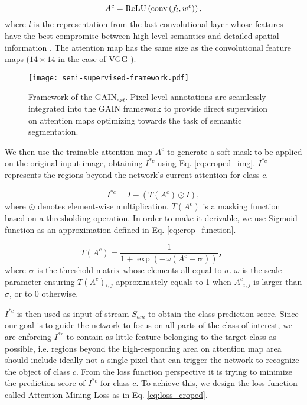 \documentclass[10pt,twocolumn,letterpaper]{article}
\begin{document}
\begin{equation}
\label{eq:attention_map}
{A^c} = {\mathop{\rm ReLU}\nolimits} \left( {{\mathop{\rm conv}\nolimits} \left( {{f_l},{w^c}} \right)} \right),
\end{equation}
where $l$ is the representation from the last convolutional layer whose features have the best compromise between high-level semantics and detailed spatial information \cite{simonyan2013deep}. The attention map has the same size as the convolutional feature maps ($14 \times 14$ in the case of VGG \cite{simonyan2014very}).


\begin{figure*}%
\centering
\texttt{[image: semi-supervised-framework.pdf]} %
\caption{Framework of the GAIN$_{ext}$. Pixel-level annotations are seamlessly integrated into the GAIN framework to provide direct supervision on attention maps optimizing towards the task of semantic segmentation.}
\label{fig:human_supervised} 
\end{figure*} 

We then use the trainable attention map $A^c$ to generate a soft mask to be applied on the original input image, obtaining $I^ {*c}$ using Eq. \ref{eq:croped_img}. $I^ {*c}$ represents the regions beyond the network's current attention for class $c$. 



\begin{equation}
\label{eq:croped_img}
{I^ {*c} } = I - \left( T\left( {{A^c}} \right) \odot I \right),
\end{equation}
where $\odot$ denotes element-wise multiplication. $T\left( {{A^c}} \right)$ is a masking function based on a thresholding operation. In order to make it derivable, we use Sigmoid function as an approximation defined in Eq. \ref{eq:crop_function}.

\begin{equation}
\label{eq:crop_function}
T\left( {{A^c}} \right) = \frac{1}{{1 + \exp \left( { - \omega \left( {{A^c} -  \boldsymbol{\sigma} } \right)} \right)}}，
\end{equation}
where $\boldsymbol{\sigma}$ is the threshold matrix whose elements all equal to $\sigma$. $\omega$ is the scale parameter ensuring $T\left( {{A^c}} \right){}_{i,j}$ approximately equals to 1 when ${A^c}_{i,j}$ is larger than $\sigma$, or to 0 otherwise. 



$I^ {*c}$ is then used as input of stream ${S_{am}}$ to obtain the class prediction score. Since our goal is to guide the network to focus on all parts of the class of interest, we are enforcing $I^ {*c}$ to contain as little feature belonging to the target class as possible, i.e. regions beyond the high-responding area on attention map area should include ideally not a single pixel that can trigger the network to recognize the object of class $c$. From the loss function perspective it is trying to minimize the prediction score of $I^ {*c}$ for class $c$. To achieve this, we design the loss function called Attention Mining Loss as in Eq. \ref{eq:loss_croped}.
\end{document}
